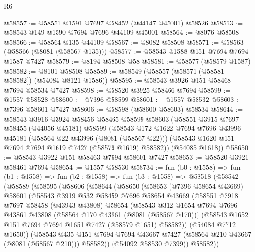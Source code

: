 \begin{lexlean}{R6}
\begin{coremodule}
@58557 := @58551 @1591 @7697 @58452 (@44147 @45001) @58526
@58563 := @58543 @149 @1590 @7694 @7696 @44109 @45001
@58564 := @8076 @58508
@58566 := @58564 @135 @44109
@58567 := @8082 @58508
@58571 := @58563 (@58566 (@8081 (@58567 @135)))
@58577 := @58543 @1588 @151 @7694 @7694 @1587 @7427
@58579 := @8194 @58508 @58
@58581 := @58577 (@58579 @1587)
@58582 := @8101 @58508
@58589 := @58549 (@58557 (@58571 (@58581 @58582)) (@54084 @8121 @1586))
@58595 := @58543 @3926 @151 @58468 @7694 @58534 @7427
@58598 := @58520 @3925 @58466 @7694
@58599 := @1557 @58528
@58600 := @7396 @58599
@58601 := @1557 @58532
@58603 := @7396 @58601 @7427
@58606 := @58598 (@58600 @58603) @58534
@58644 := @58543
    @3916
    @3924
    @58456
    @58465
    @58599
    @58603
    (@58551
      @3915
      @7697
      @58455
      (@44056 @45181)
      @58599
      (@58543
        @172
        @1622
        @7694
        @7696
        @43996
        @45181
        (@58564 @22 @43996 (@8081 (@58567 @22)))
        (@58543 @1620 @151 @7694 @7694 @1619 @7427 (@58579 @1619) @58582))
      (@54085 @1618))
@58650 := @58543 @3922 @151 @58463 @7694 @58601 @7427
@58653 := @58520 @3921 @58461 @7694
@58654 := @1557 @58530
@58734 := fun (b0 : @1558) =>
  fun (b1 : @1558) =>
  fun (b2 : @1558) =>
  fun (b3 : @1558) =>
  @58518
    (@58542
      (@58589
        (@58595
          (@58606
            (@58644
              (@58650
                (@58653
                  (@7396 @58654 @43669)
                  @58601
                  (@58543
                    @3919
                    @532
                    @58459
                    @7696
                    @58654
                    @43669
                    (@58551
                      @3918
                      @7697
                      @58458
                      (@43943 @43808)
                      @58654
                      (@58543
                        @312
                        @1654
                        @7694
                        @7696
                        @43861
                        @43808
                        (@58564 @170 @43861 (@8081 (@58567 @170)))
                        (@58543 @1652 @151 @7694 @7694 @1651 @7427 (@58579 @1651) @58582))
                      (@54084 @7712 @1650))
                    (@58543
                      @435
                      @151
                      @7694
                      @7694
                      @43667
                      @7427
                      (@58564 @210 @43667 (@8081 (@58567 @210)))
                      @58582))
                  (@54092 @58530 @7399))
                @58582))

\end{coremodule}
\end{lexlean}
